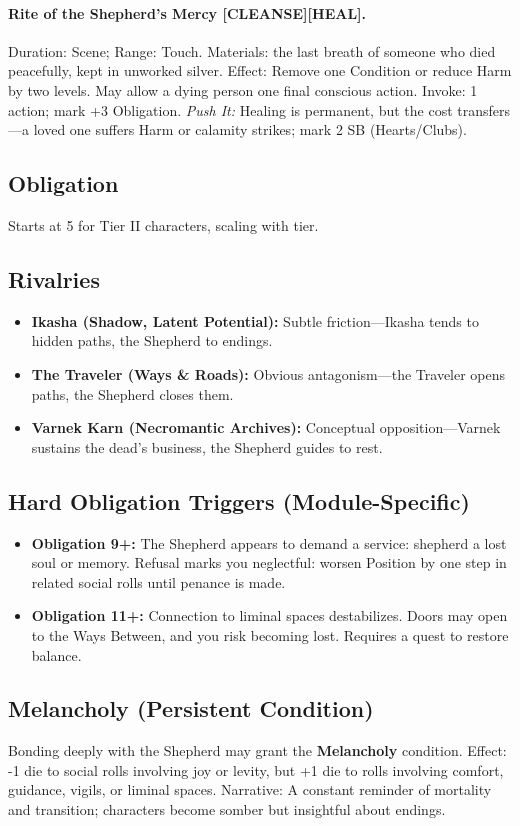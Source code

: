 \paragraph{Rite of the Shepherd's Mercy [CLEANSE][HEAL].} Duration: Scene; Range: Touch.  
Materials: the last breath of someone who died peacefully, kept in unworked silver.  
Effect: Remove one Condition or reduce Harm by two levels. May allow a dying person one final conscious action.  
Invoke: 1 action; mark +3 Obligation.  
\emph{Push It:} Healing is permanent, but the cost transfers---a loved one suffers Harm or calamity strikes; mark 2 SB (Hearts/Clubs).

\subsection*{Obligation}
Starts at 5 for Tier II characters, scaling with tier.

\subsection*{Rivalries}
\begin{itemize}
  \item \textbf{Ikasha (Shadow, Latent Potential):} Subtle friction---Ikasha tends to hidden paths, the Shepherd to endings.
  \item \textbf{The Traveler (Ways \& Roads):} Obvious antagonism---the Traveler opens paths, the Shepherd closes them.
  \item \textbf{Varnek Karn (Necromantic Archives):} Conceptual opposition---Varnek sustains the dead's business, the Shepherd guides to rest.
\end{itemize}

\subsection*{Hard Obligation Triggers (Module-Specific)}
\begin{itemize}
  \item \textbf{Obligation 9+:} The Shepherd appears to demand a service: shepherd a lost soul or memory. Refusal marks you neglectful: worsen Position by one step in related social rolls until penance is made.
  \item \textbf{Obligation 11+:} Connection to liminal spaces destabilizes. Doors may open to the Ways Between, and you risk becoming lost. Requires a quest to restore balance.
\end{itemize}

\subsection*{Melancholy (Persistent Condition)}
Bonding deeply with the Shepherd may grant the \textbf{Melancholy} condition.  
Effect: -1 die to social rolls involving joy or levity, but +1 die to rolls involving comfort, guidance, vigils, or liminal spaces.  
Narrative: A constant reminder of mortality and transition; characters become somber but insightful about endings.
